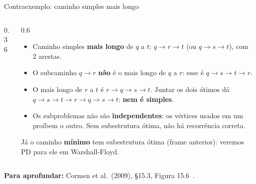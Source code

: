 \documentclass[aspectratio=169,xcolor=table]{beamer}
\newcommand{\fonte}[1]{%
  \vfill
  {\tiny\color{gray!55!black}\textbf{Para aprofundar:} #1\par}%
}
\begin{document}
\begin{frame}{Contraexemplo: caminho simples mais longo}
  \begin{columns}[c]
    \begin{column}{0.36\textwidth}
      \centering
    \end{column}
    \begin{column}{0.6\textwidth}
      \scriptsize
      \begin{itemize}\scriptsize
        \item Caminho simples \textbf{mais longo} de $q$ a $t$: $q\to r\to t$ (ou
              $q\to s\to t$), com 2 arestas.
        \item O subcaminho $q\to r$ \textbf{não} é o mais longo de $q$ a $r$: esse é
              $q\to s\to t\to r$.
        \item O mais longo de $r$ a $t$ é $r\to q\to s\to t$. Juntar os dois ótimos dá
              $q\to s\to t\to r\to q\to s\to t$: \textbf{nem é simples}.
        \item Os subproblemas não são \textbf{independentes}: os vértices usados em um
              proíbem o outro. Sem subestrutura ótima, não há recorrência correta.
      \end{itemize}
      \smallskip
      Já o caminho \textbf{mínimo} tem subestrutura ótima (frame anterior): veremos PD para
      ele em Warshall-Floyd.
    \end{column}
  \end{columns}
  \fonte{Cormen et al.\ (2009), \S 15.3, Figura 15.6~\cite{cormen2009introduction}.}
\end{frame}
\end{document}
